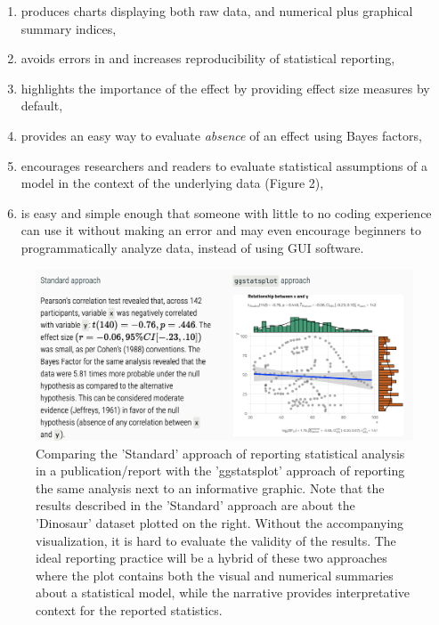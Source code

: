 \documentclass[10pt,a4paper,onecolumn]{article}
\begin{document}
\begin{enumerate}
\def\labelenumi{\alph{enumi}.}
\item
  produces charts displaying both raw data, and numerical plus graphical
  summary indices,
\item
  avoids errors in and increases reproducibility of statistical
  reporting,
\item
  highlights the importance of the effect by providing effect size
  measures by default,
\item
  provides an easy way to evaluate \emph{absence} of an effect using
  Bayes factors,
\item
  encourages researchers and readers to evaluate statistical assumptions
  of a model in the context of the underlying data (Figure 2),
\item
  is easy and simple enough that someone with little to no coding
  experience can use it without making an error and may even encourage
  beginners to programmatically analyze data, instead of using GUI
  software.
\end{enumerate}

\begin{figure}
\includegraphics[width=1\linewidth]{reporting} \caption{Comparing the 'Standard' approach of reporting statistical analysis in a publication/report with the 'ggstatsplot' approach of reporting the same analysis next to an informative graphic. Note that the results described in the 'Standard' approach are about the 'Dinosaur' dataset plotted on the right. Without the accompanying visualization, it is hard to evaluate the validity of the results. The ideal reporting practice will be a hybrid of these two approaches where the plot contains both the visual and numerical summaries about a statistical model, while the narrative provides interpretative context for the reported statistics.}\label{fig:reporting}
\end{figure}
\end{document}
